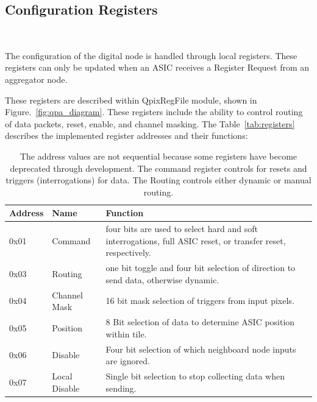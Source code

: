 \subsection{Configuration Registers}~\label{sec:registers}

The configuration of the digital node is handled through local registers.
These registers can only be updated when an ASIC receives a Register Request from an aggregator node.

These registers are described within QpixRegFile module, shown in Figure.~\ref{fig:qpa_diagram}.
These registers include the ability to control routing of data packets, reset, enable, and channel masking.
The Table~\ref{tab:registers} describes the implemented register addresses and their functions:

\begin{table}
\begin{center}
\begin{tabular}{||p{30mm} p{30mm} p{90mm}||}
 \hline
 Address & Name & Function \\ [0.5ex]
 \hline\hline
  0x01 & Command & four bits are used to select hard and soft interrogations, full ASIC reset, or transfer reset, respectively. \\
 \hline
  0x03 & Routing & one bit toggle and four bit selection of direction to send data, otherwise dynamic. \\
 \hline
  0x04 & Channel Mask & 16 bit mask selection of triggers from input pixels. \\
 \hline
  0x05 & Position & 8 Bit selection of data to determine ASIC position within tile. \\
 \hline
  0x06 & Disable & Four bit selection of which neighboard node inputs are ignored. \\
 \hline
  0x07 & Local Disable & Single bit selection to stop collecting data when sending. \\
 \hline
\end{tabular}
\caption{The address values are not sequential because some registers have become deprecated through development.
The command register controls for resets and triggers (interrogations) for data.
The Routing controls either dynamic or manual routing.
}
\end{center}
\end{table}
~\label{table:node_registers}

